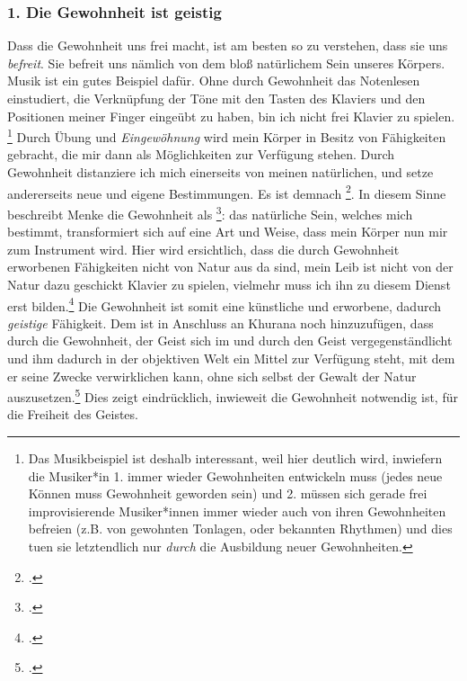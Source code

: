 \documentclass[12pt, a4paper, openany]{report}
\begin{document}
\subsubsection{1. Die Gewohnheit ist geistig}
Dass die Gewohnheit uns frei macht, ist am besten so zu verstehen, dass sie uns \emph{befreit}. 
Sie befreit uns nämlich von dem bloß natürlichem Sein unseres Körpers.
Musik ist ein gutes Beispiel dafür. 
Ohne durch Gewohnheit das Notenlesen einstudiert, die Verknüpfung der Töne mit den Tasten des Klaviers und den Positionen meiner Finger eingeübt zu haben, bin ich nicht frei Klavier zu spielen.%
\footnote{
    Das Musikbeispiel ist deshalb interessant, weil hier deutlich wird, inwiefern die Musiker*in 1. immer wieder Gewohnheiten entwickeln muss (jedes neue Können muss Gewohnheit geworden sein) und 2. müssen sich gerade frei improvisierende Musiker*innen immer wieder auch von ihren Gewohnheiten befreien (z.B. von gewohnten Tonlagen, oder bekannten Rhythmen) und dies tuen sie letztendlich nur \emph{durch} die Ausbildung neuer Gewohnheiten.
}
Durch Übung und \emph{Eingewöhnung} wird mein Körper in Besitz von Fähigkeiten gebracht, die mir dann als Möglichkeiten zur Verfügung stehen.
Durch Gewohnheit distanziere ich mich einerseits von meinen natürlichen, und setze andererseits neue und eigene Bestimmungen. 
Es ist demnach \footcite[][§ 410 A, S. 185]{hegel_enzyklopädie_1969}.
In diesem Sinne beschreibt Menke die Gewohnheit als \footcite[][130]{menke_autonomie_2018}:
das natürliche Sein, welches mich bestimmt, transformiert sich auf eine Art und Weise, dass mein Körper nun mir zum Instrument wird.
Hier wird ersichtlich, dass die durch Gewohnheit erworbenen Fähigkeiten nicht von Natur aus da sind, mein Leib ist nicht von der Natur dazu geschickt Klavier zu spielen, vielmehr muss ich ihn zu diesem Dienst erst bilden.\footcite[Vgl.][§ 410 Z, S. 190]{hegel_enzyklopädie_1969}
Die Gewohnheit ist somit eine künstliche und erworbene, dadurch \emph{geistige} Fähigkeit.
Dem ist in Anschluss an Khurana noch hinzuzufügen, dass durch die Gewohnheit, der Geist sich im und durch den Geist vergegenständlicht und ihm dadurch in der objektiven Welt ein Mittel zur Verfügung steht, mit dem er seine Zwecke verwirklichen kann, ohne sich selbst der Gewalt der Natur auszusetzen.\footcite[Vgl.][426]{khurana_freiheit_2017}
Dies zeigt eindrücklich, inwieweit die Gewohnheit notwendig ist, für die Freiheit des Geistes.
\end{document}
